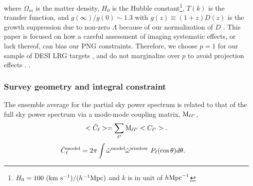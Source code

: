 where $\Omega_{m}$ is the matter density, $H_{0}$ is the Hubble constant\footnote{$H_{0}=100~({\rm km}~{\rm s}^{-1})/(h^{-1}{\rm Mpc})$ and $k$ is in unit of $h {\rm Mpc}^{-1}$}, $T(k)$ is the transfer function, and $g(\infty)/g(0) \sim 1.3$ with $g(z)\equiv (1+z) D(z)$ is the growth suppression due to non-zero $\Lambda$ because of our normalization of $D$ \citep[see, e.g.,][]{2010JCAP...07..013R, 2019MNRAS.485.4160M}.  This paper is focused on how a careful assessment of imaging systematic effects, or lack thereof, can bias our PNG constraints. Therefore, we choose $p=1$ for our sample of DESI LRG targets \citep[see, also,][]{slosar2008constraints,2010JCAP...07..013R,2013MNRAS.428.1116R}, and do not marginalize over $p$ to avoid projection effects \citep{2022JCAP...11..013B}. .

\subsubsection{Survey geometry and integral constraint}
 The ensemble average for the partial sky power spectrum is related to that of the full sky power spectrum via a mode-mode coupling matrix, ${\rm M}_{\ell \ell^{\prime}}$,
\begin{equation}\label{eq:mixm}
    <\tilde{C}_{\ell}> = \sum_{\ell^{\prime}} {\rm M}_{\ell \ell^{\prime}}<C_{\ell^{\prime}}>.
\end{equation}
\begin{align}
    \tilde{C}^{\rm model}_{\ell} &= 2\pi \int \hat{\omega}^{\rm model}\hat{\omega}^{\rm window}~P_{\ell}(\cos \theta) d\theta.
\end{align}

